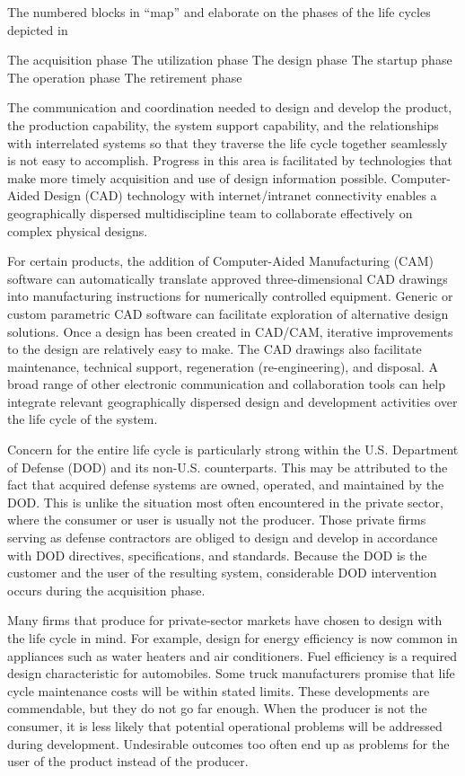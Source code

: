 The numbered blocks in ``map'' and elaborate on the phases of the life cycles depicted in 

The acquisition phase 
The utilization phase
The design phase
The startup phase
The operation phase
The retirement phase

The communication and coordination needed to design and develop the product, the production capability, the system support capability, and the relationships with interrelated systems so that they traverse the life cycle together seamlessly is not easy to accomplish. Progress in this area is facilitated by technologies that make more timely acquisition and use of design information possible. Computer-Aided Design (CAD) technology with internet/intranet connectivity enables a geographically dispersed multidiscipline team to collaborate effectively on complex physical designs.

For certain products, the addition of Computer-Aided Manufacturing (CAM) software can automatically translate approved three-dimensional CAD drawings into manufacturing instructions for numerically controlled equipment. Generic or custom parametric CAD software can facilitate exploration of alternative design solutions. Once a design has been created in CAD/CAM, iterative improvements to the design are relatively easy to make. The CAD drawings also facilitate maintenance, technical support, regeneration (re-engineering), and disposal. A broad range of other electronic communication and collaboration tools can help integrate relevant geographically dispersed design and development activities over the life cycle of the system.

Concern for the entire life cycle is particularly strong within the U.S. Department of Defense (DOD) and its non-U.S. counterparts. This may be attributed to the fact that acquired defense systems are owned, operated, and maintained by the DOD. This is unlike the situation most often encountered in the private sector, where the consumer or user is usually not the producer. Those private firms serving as defense contractors are obliged to design and develop in accordance with DOD directives, specifications, and standards. Because the DOD is the customer and the user of the resulting system, considerable DOD intervention occurs during the acquisition phase.

Many firms that produce for private-sector markets have chosen to design with the life cycle in mind. For example, design for energy efficiency is now common in appliances such as water heaters and air conditioners. Fuel efficiency is a required design characteristic for automobiles. Some truck manufacturers promise that life cycle maintenance costs will be within stated limits. These developments are commendable, but they do not go far enough. When the producer is not the consumer, it is less likely that potential operational problems will be addressed during development. Undesirable outcomes too often end up as problems for the user of the product instead of the producer.

